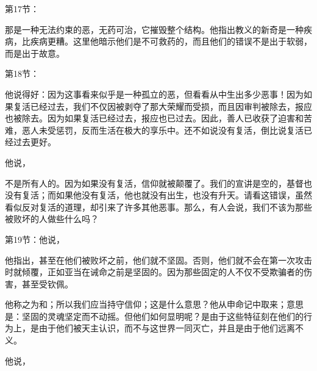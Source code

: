 第17节： \par

那是一种无法约束的恶，无药可治，它摧毁整个结构。他指出教义的新奇是一种疾病，比疾病更糟。这里他暗示他们是不可救药的，而且他们的错误不是出于软弱，而是出于故意。\par

\par

第18节： \par

他说得好：因为这事看来似乎是一种孤立的恶，但看看从中生出多少恶事！因为如果复活已经过去，我们不仅因被剥夺了那大荣耀而受损，而且因审判被除去，报应也被除去。因为如果复活已经过去，报应也已过去。因此，善人已收获了迫害和苦难，恶人未受惩罚，反而生活在极大的享乐中。还不如说没有复活，倒比说复活已经过去更好。\par

他说，\par

不是所有人的。因为如果没有复活，信仰就被颠覆了。我们的宣讲是空的，基督也没有复活；而如果他没有复活，他也就没有出生，也没有升天。请看这错误，虽然看似反对复活的道理，却引来了许多其他恶事。那么，有人会说，我们不该为那些被败坏的人做些什么吗？\par

第19节：他说， \par

他指出，甚至在他们被败坏之前，他们就不坚固。否则，他们就不会在第一次攻击时就倾覆，正如亚当在诫命之前是坚固的。因为那些固定的人不仅不受欺骗者的伤害，甚至受钦佩。\par

他称之为和；所以我们应当持守信仰；这是什么意思？他从申命记中取来；意思是：坚固的灵魂坚定而不动摇。但他们如何显明呢？是由于这些特征刻在他们的行为上，是由于他们被天主认识，而不与这世界一同灭亡，并且是由于他们远离不义。\par

他说，\par

